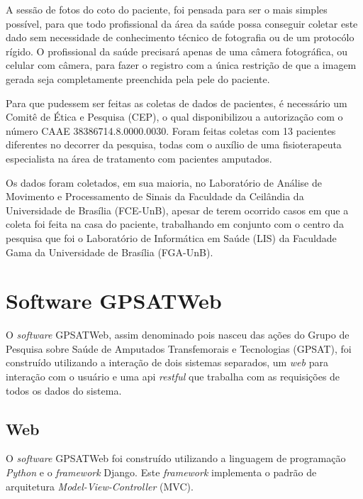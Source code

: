     A sessão de fotos do coto do paciente, foi pensada para ser o mais simples possível, para que todo profissional da área da saúde possa conseguir coletar este dado sem necessidade de conhecimento técnico de fotografia ou de um protocólo rígido. O profissional da saúde precisará apenas de uma câmera fotográfica, ou celular com câmera, para fazer o registro com a única restrição de que a imagem gerada seja completamente preenchida pela pele do paciente.

    Para que pudessem ser feitas as coletas de dados de pacientes, é necessário um Comitê de Ética e Pesquisa (CEP), o qual disponibilizou a autorização com o número CAAE 38386714.8.0000.0030. Foram feitas coletas com 13 pacientes diferentes no decorrer da pesquisa, todas com o auxílio de uma fisioterapeuta especialista na área de tratamento com pacientes amputados.

    Os dados foram coletados, em sua maioria, no Laboratório de Análise de Movimento e Processamento de Sinais da Faculdade da Ceilândia da Universidade de Brasília (FCE-UnB), apesar de terem ocorrido casos em que a coleta foi feita na casa do paciente, trabalhando em conjunto com o centro da pesquisa que foi o Laboratório de Informática em Saúde (LIS) da Faculdade Gama da Universidade de Brasília (FGA-UnB). 



\section{Software GPSATWeb}
    O \textit{software} GPSATWeb, assim denominado pois nasceu das ações do Grupo de Pesquisa sobre Saúde de Amputados Transfemorais e Tecnologias (GPSAT), foi construído utilizando a interação de dois sistemas separados, um \textit{web} para interação com o usuário e uma api \textit{restful} que trabalha com as requisições de todos os dados do sistema. 

    \subsection{Web}
        O \textit{software} GPSATWeb foi construído utilizando a linguagem de programação \textit{Python} e o \textit{framework} Django. Este \textit{framework} implementa o padrão de arquitetura \textit{Model-View-Controller} (MVC).

